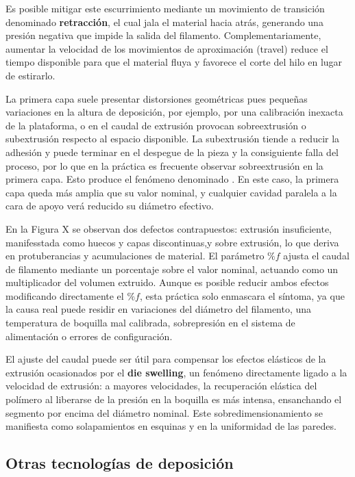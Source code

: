 Es posible mitigar este escurrimiento mediante un movimiento de transición denominado \textbf{retracción}, el cual jala el material hacia atrás, generando una presión negativa que impide la salida del filamento. Complementariamente, aumentar la velocidad de los movimientos de aproximación (travel) reduce el tiempo disponible para que el material fluya y favorece el corte del hilo en lugar de estirarlo.  

La primera capa suele presentar distorsiones geométricas pues pequeñas variaciones en la altura de deposición, por ejemplo, por una calibración inexacta de la plataforma, o en el caudal de extrusión provocan sobreextrusión o subextrusión respecto al espacio disponible. La subextrusión tiende a reducir la adhesión y puede terminar en el despegue de la pieza y la consiguiente falla del proceso, por lo que en la práctica es frecuente observar sobreextrusión en la primera capa. Esto produce el fenómeno denominado . En este caso, la primera capa queda más amplia que su valor nominal, y cualquier cavidad paralela a la cara de apoyo verá reducido su diámetro efectivo. 

 En la Figura X se observan dos defectos contrapuestos: extrusión insuficiente, manifesstada como huecos y capas discontinuas,y sobre extrusión, lo que deriva en protuberancias y acumulaciones de material. El parámetro $\%f$ ajusta el caudal de filamento mediante un porcentaje sobre el valor nominal, actuando como un multiplicador del volumen extruido. Aunque es posible reducir ambos efectos modificando directamente el $\%f$, esta práctica solo enmascara el síntoma, ya que la causa real puede residir en variaciones del diámetro del filamento, una temperatura de boquilla mal calibrada, sobrepresión en el sistema de alimentación o errores de configuración.

El ajuste del caudal puede ser útil para compensar los efectos elásticos de la extrusión ocasionados por el \textbf{die swelling}, un fenómeno directamente ligado a la velocidad de extrusión: a mayores velocidades, la recuperación elástica del polímero al liberarse de la presión en la boquilla es más intensa, ensanchando el segmento por encima del diámetro nominal. Este sobredimensionamiento se manifiesta como solapamientos en esquinas y en la uniformidad de las paredes. 

\subsection{Otras tecnologías de deposición}

